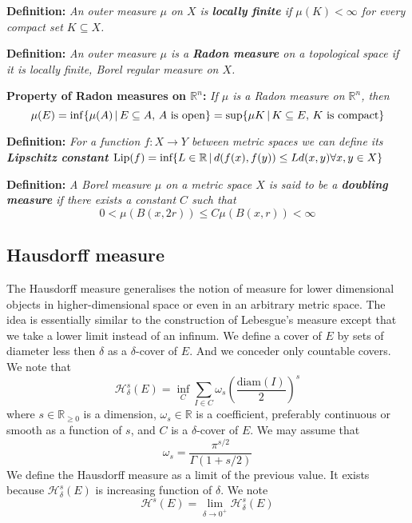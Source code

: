 \documentclass{article}
\begin{document}
\vspace{2ex}
\textbf{Definition:} \textit{An outer measure $\mu$ on $X$ is \textbf{locally finite} if
$\mu(K)<\infty$ for every compact set $K\subseteq X$.}

\vspace{2ex}
\textbf{Definition:} \textit{An outer measure $\mu$ is a \textbf{Radon measure} on a
topological space if it is locally finite, Borel regular measure on $X$.}

\vspace{2ex}
\textbf{Property of Radon measures on $\mathbb{R}^n$:} \textit{If $\mu$ is a Radon
measure on $\mathbb{R}^n$, then
\[
    \mu(E)=\inf\{\mu(A)\,|\,E\subseteq A,\,A\textnormal{ is open}\}
          =\sup\{\mu{K}\,|\,K\subseteq E,\,K\textnormal{ is compact}\}
\]}

\vspace{2ex}
\textbf{Definition:} \textit{For a function $f:X\rightarrow Y$ between metric spaces we can
define its \textbf{Lipschitz constant} $\text{Lip}(f) = \textnormal{inf}\{L\in
\mathbb{R}\,|\,d(f(x),f(y))\leq Ld(x,y) \forall x,y\in X\}$}

\vspace{2ex}
\textbf{Definition:} \textit{A Borel measure $\mu$ on a metric space $X$ is
said to be a \textbf{doubling measure} if there exists a constant $C$ such that
\[0<\mu(B(x,2r))\leq C\mu(B(x,r))<\infty\]}
\subsection{Hausdorff measure}
The Hausdorff measure generalises the notion of measure for lower dimensional
objects in higher-dimensional space or even in an arbitrary metric space. The
idea is essentially similar to the
construction of Lebesgue's measure except that we take a lower limit instead of
an infinum. We define a cover of $E$ by sets of diameter less then $\delta$ as
a $\delta$-cover of $E$. And we conceder only countable covers. We note that
\[\mathcal{H}_\delta^s(E)=\inf_{C}\sum_{I\in C}\omega_s\left(\frac{\text{diam}(I)}{2}\right)^s\]
where $s\in\mathbb{R}_{\geq 0}$ is a dimension, $\omega_s\in\mathbb{R}$ is a
coefficient, preferably continuous or smooth as a function of $s$, and $C$ is a
$\delta$-cover of $E$. We may assume that
\[\omega_s = \frac{\pi^{s/2}}{\Gamma(1+s/2)}\]
We define the Hausdorff measure as a limit of the previous value. It exists
because $\mathcal{H}_\delta^s(E)$ is increasing function of $\delta$. We note
\[\mathcal{H}^s(E)=\lim_{\delta\rightarrow0^+}\mathcal{H}^s_\delta(E)\]
\end{document}
